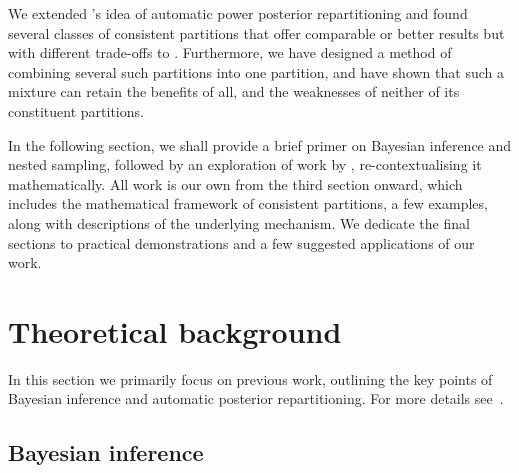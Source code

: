 \documentclass[usenatbib]{mnras}
\begin{document}
We extended \cite{chen-ferroz-hobson}'s idea of automatic power
posterior repartitioning and found several classes of consistent
partitions that offer comparable or better results but with different
trade-offs to \cite{chen-ferroz-hobson}. Furthermore, we have designed
a method of combining several such partitions into one partition, and
have shown that such a mixture can retain the benefits of all, and the
weaknesses of neither of its constituent partitions.

In the following section, we shall provide a brief primer on Bayesian
inference and nested sampling, followed by an exploration of work by
\cite{chen-ferroz-hobson}, re-contextualising it mathematically. All
work is our own from the third section onward, which includes the
mathematical framework of consistent partitions, a few examples, along
with descriptions of the underlying mechanism. We dedicate the final
sections to practical demonstrations and a few suggested applications
of our work.

\section{Theoretical background}\label{sec:orge6061a4}
In this section we primarily focus on previous work, outlining the key
points of Bayesian inference and automatic posterior
repartitioning. For more details see~\cite{jeffreys2010scientific}.
\subsection{Bayesian inference}\label{sec:primer}
\end{document}
